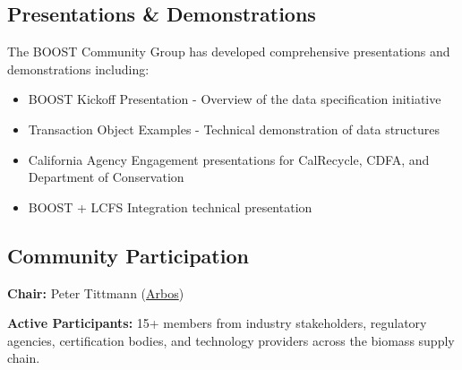 
\subsection{Presentations \& Demonstrations}
\label{sec:presentations}

The BOOST Community Group has developed comprehensive presentations and demonstrations including:

\begin{itemize}
    \item BOOST Kickoff Presentation - Overview of the data specification initiative
    \item Transaction Object Examples - Technical demonstration of data structures
    \item California Agency Engagement presentations for CalRecycle, CDFA, and Department of Conservation
    \item BOOST + LCFS Integration technical presentation
\end{itemize}

\subsection{Community Participation}
\label{sec:community-participation}

\begin{informative}[title=BOOST Membership]
\textbf{Chair:} Peter Tittmann (\href{https://arbos.bio}{Arbos})

\textbf{Active Participants:} 15+ members from industry stakeholders, regulatory agencies, certification bodies, and technology providers across the biomass supply chain.
\end{informative}